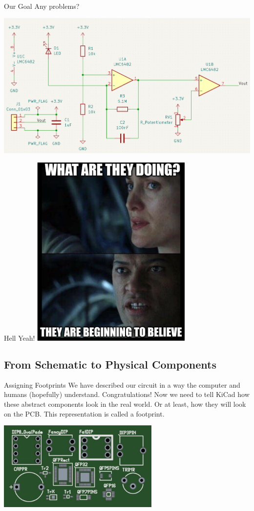 \documentclass{beamer}
\begin{document}
\begin{frame}{Our Goal}
  Any problems?

  \includegraphics[width=\textwidth]{images/schematic-goal.png}
\end{frame}

\begin{frame}{Hell Yeah!}
  \centering
  \includegraphics[width=0.6\textwidth]{images/beginning-to-believe.png}
\end{frame}

\subsection{From Schematic to Physical Components}

\begin{frame}{Assigning Footprints}
  We have described our circuit in a way the computer and humans (hopefully) understand. Congratulations!
  Now we need to tell KiCad how these abstract components look in the real world. Or at least, how they will look on the PCB.
  This representation is called a footprint.

  \centering
  \includegraphics[width=0.6\textwidth]{images/footprints.jpg}
\end{frame}
\end{document}
